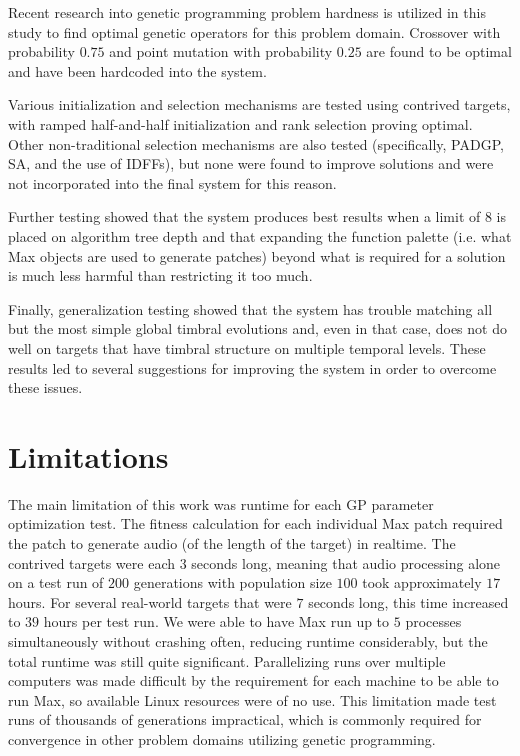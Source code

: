 \documentclass[a4paper,12pt]{report} 	%
\numberwithin{figure}{chapter}
\numberwithin{table}{chapter}
\numberwithin{equation}{chapter}
\begin{document}
\begin{flushleft}
Recent research into genetic programming problem hardness is utilized in this study to find optimal genetic operators for this problem domain. Crossover with probability $0.75$ and point mutation with probability $0.25$ are found to be optimal and have been hardcoded into the system.

Various initialization and selection mechanisms are tested using contrived targets, with ramped half-and-half initialization and rank selection proving optimal. Other non-traditional selection mechanisms are also tested (specifically, PADGP, SA, and the use of IDFFs), but none were found to improve solutions and were not incorporated into the final system for this reason.

Further testing showed that the system produces best results when a limit of $8$ is placed on algorithm tree depth and that expanding the function palette (i.e. what Max objects are used to generate patches) beyond what is required for a solution is much less harmful than restricting it too much.

Finally, generalization testing showed that the system has trouble matching all but the most simple global timbral evolutions and, even in that case, does not do well on targets that have timbral structure on multiple temporal levels. These results led to several suggestions for improving the system in order to overcome these issues.

\section{Limitations}
The main limitation of this work was runtime for each GP parameter optimization test. The fitness calculation for each individual Max patch required the patch to generate audio (of the length of the target) in realtime. The contrived targets were each $3$ seconds long, meaning that audio processing alone on a test run of $200$ generations with population size $100$ took approximately $17$ hours. For several real-world targets that were $7$ seconds long, this time increased to $39$ hours per test run. We were able to have Max run up to $5$ processes simultaneously without crashing often, reducing runtime considerably, but the total runtime was still quite significant. Parallelizing runs over multiple computers was made difficult by the requirement for each machine to be able to run Max, so available Linux resources were of no use. This limitation made test runs of thousands of generations impractical, which is commonly required for convergence in other problem domains utilizing genetic programming.


\end{flushleft}
\end{document}
